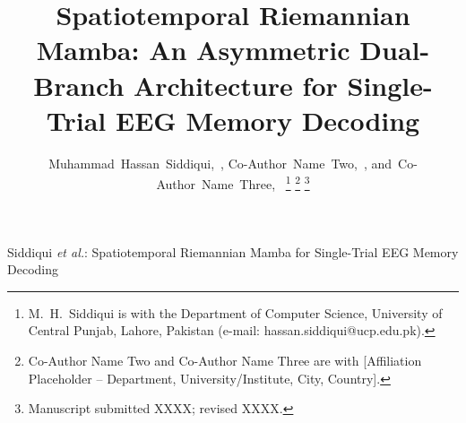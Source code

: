 \documentclass[journal]{IEEEtran}
\begin{document}
\title{Spatiotemporal Riemannian Mamba: An Asymmetric Dual-Branch Architecture for Single-Trial EEG Memory Decoding}

\author{
    Muhammad~Hassan~Siddiqui,~,
    Co-Author~Name~Two,~,
    and~Co-Author~Name~Three,~
    \thanks{M.~H.~Siddiqui is with the Department of Computer Science, University of Central Punjab, Lahore, Pakistan (e-mail: hassan.siddiqui@ucp.edu.pk).}
    \thanks{Co-Author Name Two and Co-Author Name Three are with [Affiliation Placeholder -- Department, University/Institute, City, Country].}
    \thanks{Manuscript submitted XXXX; revised XXXX.}
}

%
{Siddiqui \MakeLowercase{\textit{et al.}}: Spatiotemporal Riemannian Mamba for Single-Trial EEG Memory Decoding}

\maketitle
\end{document}
